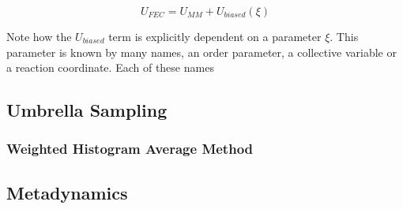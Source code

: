 \begin{equation}
U_{FEC}  = U_{MM} + U_{biased} (\xi)
\end{equation}

Note how the $U_{biased}$ term is explicitly dependent on a parameter $\xi$. This parameter is known by many names, an order parameter, a collective variable or a reaction coordinate. Each of these names 

\subsection{Umbrella Sampling}

\subsubsection{Weighted Histogram Average Method}

\subsection{Metadynamics}
